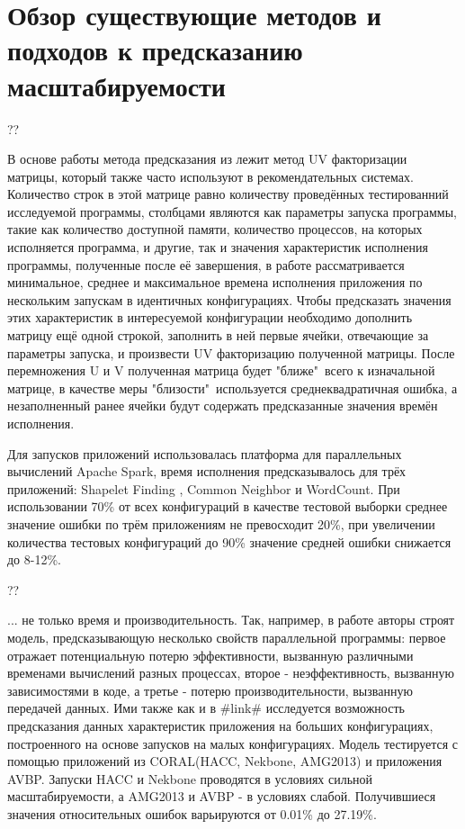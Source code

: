 
\chapter{Обзор существующие методов и подходов к предсказанию масштабируемости}

	??

	В основе работы метода предсказания из \cite{UV_matrix} лежит метод UV факторизации матрицы, который также часто используют в рекомендательных системах. Количество строк в этой матрице равно количеству проведённых тестированний исследуемой программы, столбцами являются как параметры запуска программы, такие как количество доступной памяти, количество процессов, на которых исполняется программа, и другие, так и значения характеристик исполнения программы, полученные после её завершения, в работе рассматривается минимальное, среднее и максимальное времена исполнения приложения по нескольким запускам в идентичных конфигурациях. Чтобы предсказать значения этих характеристик в интересуемой конфигурации необходимо дополнить матрицу ещё одной строкой, заполнить в ней первые ячейки, отвечающие за параметры запуска, и произвести UV факторизацию полученной матрицы. После перемножения U и V полученная матрица будет "ближе"\ всего к изначальной матрице, в качестве меры "близости"\ используется среднеквадратичная ошибка, а незаполненный ранее ячейки будут содержать предсказанные значения времён исполнения.

	Для запусков приложений использовалась платформа для параллельных вычислений Apache Spark, время исполнения предсказывалось для трёх приложений: Shapelet Finding , Common Neighbor и WordCount. При использовании 70\% от всех конфигураций в качестве тестовой выборки среднее значение ошибки по трём приложениям не превосходит 20\%, при увеличении количества тестовых конфигураций до 90\% значение средней ошибки снижается до 8-12\%.


	??

	... не только время и производительность. Так, например, в работе \cite{efficiency_prediction} авторы строят модель, предсказывающую несколько свойств параллельной программы: первое отражает потенциальную потерю эффективности, вызванную различными временами вычислений разных процессах, второе - неэффективность, вызванную зависимостями в коде, а третье - потерю производительности, вызванную передачей данных. Ими также как и в \#link\# исследуется возможность предсказания данных характеристик приложения на больших конфигурациях, построенного на основе запусков на малых конфигурациях. %
	Модель тестируется с помощью приложений из CORAL(HACC, Nekbone, AMG2013) и приложения AVBP. Запуски HACC и Nekbone проводятся в условиях сильной масштабируемости, а AMG2013 и AVBP - в условиях слабой. Получившиеся значения относительных ошибок варьируются от 0.01\% до 27.19\%.



